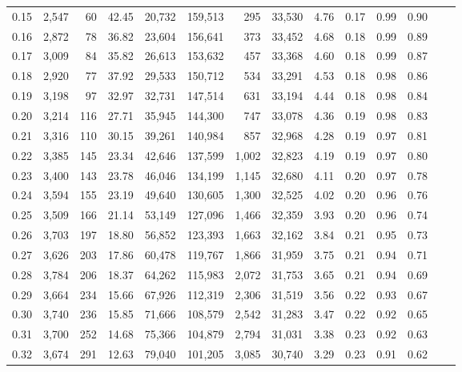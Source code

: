 \begin{tabular}{rrrrrrrrrrrrrr}
0.15 &  2,547 &   60 &   42.45 &   20,732 &  159,513 &     295 &  33,530 &  4.76 &  0.17 &  0.99 &      0.90 \\
0.16 &  2,872 &   78 &   36.82 &   23,604 &  156,641 &     373 &  33,452 &  4.68 &  0.18 &  0.99 &      0.89 \\
0.17 &  3,009 &   84 &   35.82 &   26,613 &  153,632 &     457 &  33,368 &  4.60 &  0.18 &  0.99 &      0.87 \\
0.18 &  2,920 &   77 &   37.92 &   29,533 &  150,712 &     534 &  33,291 &  4.53 &  0.18 &  0.98 &      0.86 \\
0.19 &  3,198 &   97 &   32.97 &   32,731 &  147,514 &     631 &  33,194 &  4.44 &  0.18 &  0.98 &      0.84 \\
0.20 &  3,214 &  116 &   27.71 &   35,945 &  144,300 &     747 &  33,078 &  4.36 &  0.19 &  0.98 &      0.83 \\
0.21 &  3,316 &  110 &   30.15 &   39,261 &  140,984 &     857 &  32,968 &  4.28 &  0.19 &  0.97 &      0.81 \\
0.22 &  3,385 &  145 &   23.34 &   42,646 &  137,599 &   1,002 &  32,823 &  4.19 &  0.19 &  0.97 &      0.80 \\
0.23 &  3,400 &  143 &   23.78 &   46,046 &  134,199 &   1,145 &  32,680 &  4.11 &  0.20 &  0.97 &      0.78 \\
0.24 &  3,594 &  155 &   23.19 &   49,640 &  130,605 &   1,300 &  32,525 &  4.02 &  0.20 &  0.96 &      0.76 \\
0.25 &  3,509 &  166 &   21.14 &   53,149 &  127,096 &   1,466 &  32,359 &  3.93 &  0.20 &  0.96 &      0.74 \\
0.26 &  3,703 &  197 &   18.80 &   56,852 &  123,393 &   1,663 &  32,162 &  3.84 &  0.21 &  0.95 &      0.73 \\
0.27 &  3,626 &  203 &   17.86 &   60,478 &  119,767 &   1,866 &  31,959 &  3.75 &  0.21 &  0.94 &      0.71 \\
0.28 &  3,784 &  206 &   18.37 &   64,262 &  115,983 &   2,072 &  31,753 &  3.65 &  0.21 &  0.94 &      0.69 \\
0.29 &  3,664 &  234 &   15.66 &   67,926 &  112,319 &   2,306 &  31,519 &  3.56 &  0.22 &  0.93 &      0.67 \\
0.30 &  3,740 &  236 &   15.85 &   71,666 &  108,579 &   2,542 &  31,283 &  3.47 &  0.22 &  0.92 &      0.65 \\
0.31 &  3,700 &  252 &   14.68 &   75,366 &  104,879 &   2,794 &  31,031 &  3.38 &  0.23 &  0.92 &      0.63 \\
0.32 &  3,674 &  291 &   12.63 &   79,040 &  101,205 &   3,085 &  30,740 &  3.29 &  0.23 &  0.91 &      0.62 \\

\end{tabular}
